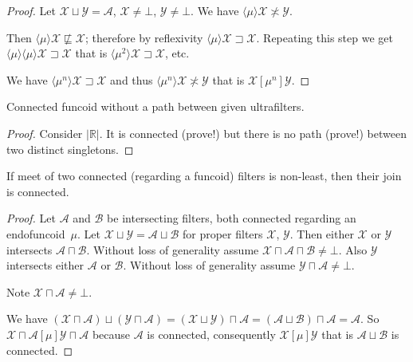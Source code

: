 \begin{proof}
  Let $\mathcal{X} \sqcup \mathcal{Y} = \mathcal{A}$, $\mathcal{X} \neq \bot$,
  $\mathcal{Y} \neq \bot$. We have $\langle \mu \rangle \mathcal{X} \nasymp
  \mathcal{Y}$.

  Then $\langle \mu \rangle \mathcal{X} \mathrel{\nsqsubseteq}
  \mathcal{X}$; therefore by reflexivity $\langle \mu \rangle \mathcal{X}
  \sqsupset \mathcal{X}$. Repeating this step we get $\langle \mu \rangle
  \langle \mu \rangle \mathcal{X} \sqsupset \mathcal{X}$ that is $\langle
  \mu^2 \rangle \mathcal{X} \sqsupset \mathcal{X}$, etc.

  We have $\langle \mu^n \rangle \mathcal{X} \sqsupset \mathcal{X}$ and thus
  $\langle \mu^n \rangle \mathcal{X} \nasymp \mathcal{Y}$ that is $\mathcal{X}
  \mathrel{[\mu^n]} \mathcal{Y}$.
\end{proof}

\begin{example}
  Connected funcoid without a path between given ultrafilters.
\end{example}

\begin{proof}
  Consider $| \mathbb{R} |$. It is connected (prove!) but there is no
  path (prove!) between two distinct singletons.
\end{proof}

\begin{thm}
  If meet of two connected (regarding a funcoid) filters is non-least,
  then their join is connected.
\end{thm}

\begin{proof}
Let $\mathcal{A}$ and $\mathcal{B}$ be intersecting filters, both
connected regarding an endofuncoid~$\mu$. Let $\mathcal{X}
\sqcup \mathcal{Y} = \mathcal{A} \sqcup \mathcal{B}$ for proper filters
$\mathcal{X}$, $\mathcal{Y}$. Then either $\mathcal{X}$ or $\mathcal{Y}$
intersects $\mathcal{A} \sqcap \mathcal{B}$. Without loss of generality assume
$\mathcal{X} \sqcap \mathcal{A} \sqcap \mathcal{B} \neq \bot$.
Also $\mathcal{Y}$ intersects
either $\mathcal{A}$ or $\mathcal{B}$. Without loss of generality assume
$\mathcal{Y} \sqcap \mathcal{A} \neq \bot$.

Note $\mathcal{X} \sqcap \mathcal{A} \neq \bot$.

We have $(\mathcal{X} \sqcap \mathcal{A}) \sqcup (\mathcal{Y} \sqcap
\mathcal{A}) = (\mathcal{X} \sqcup \mathcal{Y}) \sqcap \mathcal{A} =
(\mathcal{A} \sqcup \mathcal{B}) \sqcap \mathcal{A} = \mathcal{A}$. So
$\mathcal{X} \sqcap \mathcal{A} \mathrel{[\mu]} \mathcal{Y} \sqcap
\mathcal{A}$ because $\mathcal{A}$ is connected, consequently $\mathcal{X}
\mathrel{[\mu]} \mathcal{Y}$ that is $\mathcal{A} \sqcup \mathcal{B}$ is
connected.
\end{proof}

